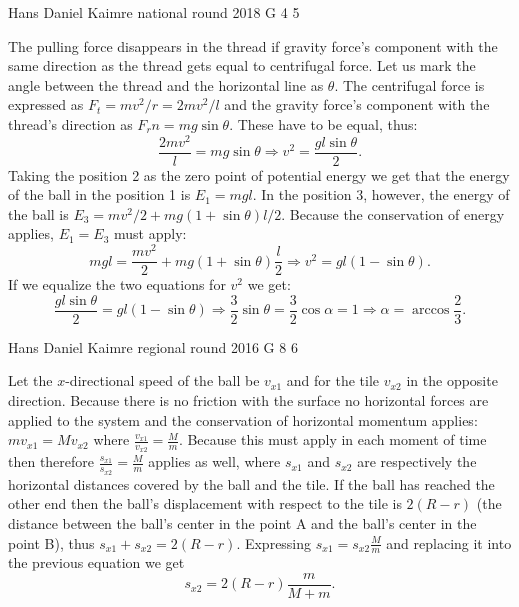 \documentclass[11pt]{article}
\begin{document}
{Hans Daniel Kaimre} %
{national round} %
{2018} %
{G 4} %
{5} %
{

\ifEngSolution
The pulling force disappears in the thread if gravity force’s component with the same direction as the thread gets equal to centrifugal force. Let us mark the angle between the thread and the horizontal line as $\theta$. The centrifugal force is expressed as $F_t=mv^2/r=2mv^2/l$ and the gravity force’s component with the thread’s direction as $F_rn=mg\sin\theta$. These have to be equal, thus:
$$\frac{2mv^2}{l}=mg\sin\theta \Rightarrow v^2=\frac{gl\sin\theta}{2}.$$ 
Taking the position 2 as the zero point of potential energy we get that the energy of the ball in the position 1 is $E_1=mgl$. In the position 3, however, the energy of the ball is $E_3=mv^2/2+mg(1+\sin\theta)l/2$. Because the conservation of energy applies, $E_1=E_3$ must apply:
$$mgl=\frac{mv^2}{2}+mg(1+\sin\theta)\frac{l}{2} \Rightarrow v^2=gl(1-\sin\theta).$$ 
If we equalize the two equations for $v^2$ we get:
$$\frac{gl\sin\theta}{2}=gl(1-\sin\theta)\Rightarrow \frac{3}{2}\sin\theta=\frac{3}{2}\cos\alpha=1 \Rightarrow \alpha=\arccos\frac{2}{3}.$$
\fi
}

{Hans Daniel Kaimre} %
{regional round} %
{2016} %
{G 8} %
{6} %
{

\ifEngSolution
Let the $x$-directional speed of the ball be $v_{x1}$ and for the tile $v_{x2}$ in the opposite direction. Because there is no friction with the surface no horizontal forces are applied to the system and the conservation of horizontal momentum applies: $mv_{x1}=Mv_{x2}$ where $\frac{v_{x1}}{v_{x2}}=\frac{M}{m}$. Because this must apply in each moment of time then therefore $\frac{s_{x1}}{s_{x2}}=\frac{M}{m}$ applies as well, where $s_{x1}$ and $s_{x2}$ are respectively the horizontal distances covered by the ball and the tile. If the ball has reached the other end then the ball’s displacement with respect to the tile is $2(R-r)$ (the distance between the ball’s center in the point A and the ball’s center in the point B), thus $s_{x1}+s_{x2}=2(R-r)$. Expressing $s_{x1} = s_{x2}\frac Mm$ and replacing it into the previous equation we get
$$s_{x2}=2(R-r)\frac{m}{M+m}.$$
\fi
}
\end{document}
